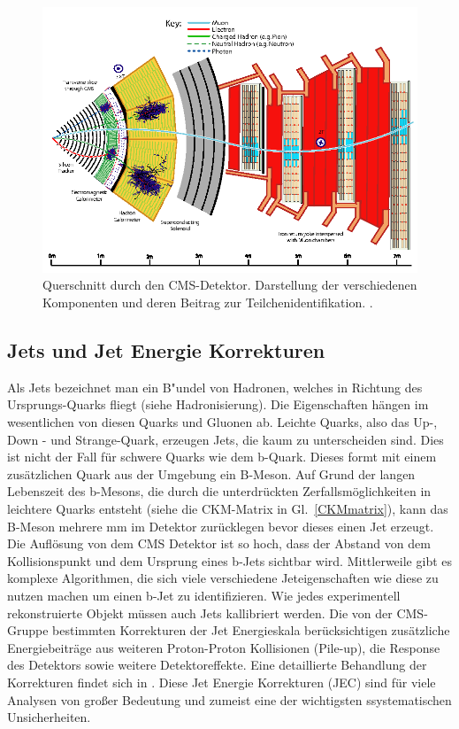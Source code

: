 \begin{figure}[ht]
	\centering
	\includegraphics[scale=0.45]{LHC/cms_particle_identification}
	\caption[CMS im Querschnitt]{Querschnitt durch den CMS-Detektor. Darstellung der verschiedenen Komponenten und deren Beitrag zur Teilchenidentifikation. \cite{Sirunyan:2270046}.}
	\label{cernkomplex}
\end{figure}
\clearpage
\subsection{Jets und Jet Energie Korrekturen} 
Als Jets bezeichnet man ein B"undel von Hadronen, welches in Richtung des Ursprungs-Quarks fliegt (siehe Hadronisierung). 
Die Eigenschaften hängen im wesentlichen von diesen Quarks und Gluonen ab. Leichte Quarks, also das Up-, Down - und Strange-Quark, erzeugen Jets, die kaum zu unterscheiden sind. Dies ist nicht der Fall für schwere Quarks wie dem b-Quark. Dieses formt mit einem zusätzlichen Quark aus der Umgebung ein B-Meson. Auf Grund der langen Lebenszeit des b-Mesons, die durch die unterdrückten Zerfallsmöglichkeiten in leichtere Quarks entsteht (siehe die CKM-Matrix in Gl.~\ref{CKMmatrix}), kann das B-Meson mehrere $\mathrm{mm}$ im Detektor zurücklegen bevor dieses einen Jet erzeugt. Die Auflösung von dem CMS Detektor ist so hoch, dass der Abstand von dem Kollisionspunkt und dem Ursprung eines b-Jets  sichtbar wird. Mittlerweile gibt es komplexe Algorithmen, die sich viele verschiedene Jeteigenschaften wie diese zu nutzen machen um einen b-Jet zu identifizieren.
Wie jedes experimentell rekonstruierte Objekt m\"ussen auch Jets kallibriert werden.
Die von der CMS-Gruppe bestimmten Korrekturen der Jet Energieskala ber\"ucksichtigen zusätzliche Energiebeitr\"age aus weiteren Proton-Proton Kollisionen (Pile-up), die Response des Detektors sowie
weitere Detektoreffekte. Eine detaillierte Behandlung der Korrekturen findet sich in \cite{Khachatryan:2016kdb}. Diese Jet Energie Korrekturen (JEC) sind f\"ur viele Analysen von gro\ss{}er Bedeutung und zumeist eine der wichtigsten ssystematischen Unsicherheiten.  

